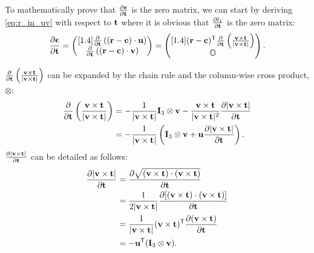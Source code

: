 \documentclass[12pt,a4paper]{scrarticle}
\newcommand{\matrixSpacingDefault}{1.4}
\newcommand{\pdiff}[2]{\ensuremath{\mathchoice
{\frac{\partial{#1}}{\partial{#2}}}%
{\frac{\partial{#1}}{\partial{#2}}}%
{\nicefrac{\partial{#1}}{\partial{#2}}}%
{\nicefrac{\partial{#1}}{\partial{#2}}}}}
\newcommand{\transpose}[1]{\ensuremath{#1^{\mathsf{T}}}}
\begin{document}
To mathematically prove that $\pdiff{\local}{\dir}$ is the zero matrix,  we can start by deriving \cref{eq:r_in_uv} with respect to $\mathbf{t}$ where it is obvious that $\pdiff{\vlocal}{\dir}$ is the zero matrix:
\begin{equation}\label{eq:dmudt}
    \pdiff{\local}{\dir} = 
    \begin{pmatrix}[\matrixSpacingDefault]
    \pdiff{}{\dir}\left((\pos - \surfaceCenter) \cdot \ubasis \right) \\
    \pdiff{}{\dir}\left((\pos - \surfaceCenter) \cdot \vbasis \right)
    \end{pmatrix} =
    \begin{pmatrix}[\matrixSpacingDefault]
    \transpose{(\pos - \surfaceCenter)} \pdiff{}{\dir} \left( \frac{\vbasis \times \dir}{|\vbasis \times \dir|} \right) \\
    \zeroMatrix
    \end{pmatrix}.    
\end{equation}

$\pdiff{}{\dir} \left( \frac{\vbasis \times \dir}{|\vbasis \times \dir|} \right)$ can be expanded by the chain rule and the column-wise cross product, $\otimes$:
\begin{align}\label{eq:dudt}
    \pdiff{}{\dir} \left( \frac{\vbasis \times \dir}{|\vbasis \times \dir|} \right) & = - \frac{1}{|\vbasis \times \dir|} \identityMatrix_3 \otimes \vbasis - \frac{\vbasis \times \dir}{|\vbasis \times \dir|^2}\pdiff{|\vbasis\times\dir|}{\dir} \nonumber \\
    & = - \frac{1}{|\vbasis \times \dir|} \left( \identityMatrix_3 \otimes \vbasis + \ubasis \pdiff{|\vbasis\times\dir|}{\dir} \right).
\end{align}
$\pdiff{|\vbasis \times \dir|}{\dir}$ can be detailed as follows:
\begin{align}\label{eq:dvtdt}
\pdiff{|\vbasis\times\dir|}{\dir} & = \pdiff{\sqrt{(\vbasis \times \dir)\cdot(\vbasis \times \dir)}}{\dir} \nonumber \\
& = \frac{1}{2|\vbasis \times \dir|} \pdiff{[(\vbasis \times \dir)\cdot(\vbasis \times \dir)]}{\dir} \nonumber \\
& = \frac{1}{|\vbasis \times \dir|}  \transpose{(\vbasis \times \dir)} \pdiff{(\vbasis \times \dir)}{\dir} \nonumber \\
& = -\transpose{\ubasis} (\identityMatrix_3 \otimes \vbasis).
\end{align}
\end{document}
